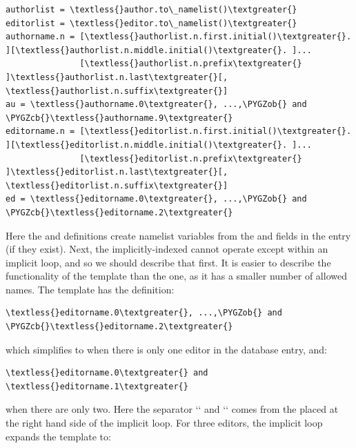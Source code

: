 \documentclass[letterpaper,10pt,english]{sphinxmanual}
\def\PYGZob{\char`\{}
\def\PYGZcb{\char`\}}
\begin{document}
\begin{Verbatim}[commandchars=\\\{\}]
authorlist = \textless{}author.to\_namelist()\textgreater{}
editorlist = \textless{}editor.to\_namelist()\textgreater{}
authorname.n = [\textless{}authorlist.n.first.initial()\textgreater{}. ][\textless{}authorlist.n.middle.initial()\textgreater{}. ]...
               [\textless{}authorlist.n.prefix\textgreater{} ]\textless{}authorlist.n.last\textgreater{}[, \textless{}authorlist.n.suffix\textgreater{}]
au = \textless{}authorname.0\textgreater{}, ...,\PYGZob{} and \PYGZcb{}\textless{}authorname.9\textgreater{}
editorname.n = [\textless{}editorlist.n.first.initial()\textgreater{}. ][\textless{}editorlist.n.middle.initial()\textgreater{}. ]...
               [\textless{}editorlist.n.prefix\textgreater{} ]\textless{}editorlist.n.last\textgreater{}[, \textless{}editorlist.n.suffix\textgreater{}]
ed = \textless{}editorname.0\textgreater{}, ...,\PYGZob{} and \PYGZcb{}\textless{}editorname.2\textgreater{}
\end{Verbatim}

Here the  and  definitions create namelist variables from the  and  fields in the entry (if they exist). Next, the implicitly-indexed  cannot operate except within an implicit loop, and so we should describe that first. It is easier to describe the functionality of the  template than the  one, as it has a smaller number of allowed names. The  template has the definition:

\begin{Verbatim}[commandchars=\\\{\}]
\textless{}editorname.0\textgreater{}, ...,\PYGZob{} and \PYGZcb{}\textless{}editorname.2\textgreater{}
\end{Verbatim}

which simplifies to  when there is only one editor in the database entry, and:

\begin{Verbatim}[commandchars=\\\{\}]
\textless{}editorname.0\textgreater{} and \textless{}editorname.1\textgreater{}
\end{Verbatim}

when there are only two. Here the separator {}`{}` and {}`{}` comes from the  placed at the right hand side of the implicit loop. For three editors, the implicit loop expands the template to:
\end{document}
